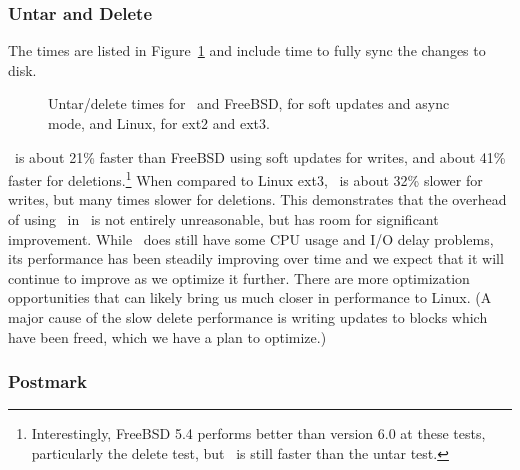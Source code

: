 \subsubsection{Untar and Delete}
\label{sec:eval:untardel}

The times are listed in Figure~\ref{fig:macro} and include time to
fully sync the changes to disk.

\begin{figure}[htb]
\caption{\label{fig:macro} Untar/delete times for \Kudos\ and FreeBSD, for soft
updates and async mode, and Linux, for ext2 and ext3.}
\end{figure}

\Kudos\ is about 21\% faster than FreeBSD using soft updates for
writes, and about 41\% faster for deletions.\footnote{Interestingly, FreeBSD 5.4
performs better than version 6.0 at these tests, particularly the delete test,
but \Kudos\ is still faster than the untar test.}
%
When compared to Linux ext3, \Kudos\ is about 32\% slower for writes, but many
times slower for deletions.
%
This demonstrates that the overhead of using \chdescs\ in \Kudos\ is not
entirely unreasonable, but has room for significant improvement.
%
While \Kudos\ does still have some CPU usage and I/O delay problems, its
performance has been steadily improving over time and we expect that it will
continue to improve as we optimize it further.
%
There are more optimization opportunities that can likely bring us much closer
in performance to Linux. (A major cause of the slow delete performance is writing
updates to blocks which have been freed, which we have a plan to optimize.)

\subsubsection {Postmark}
\label{sec:eval:postmark}

